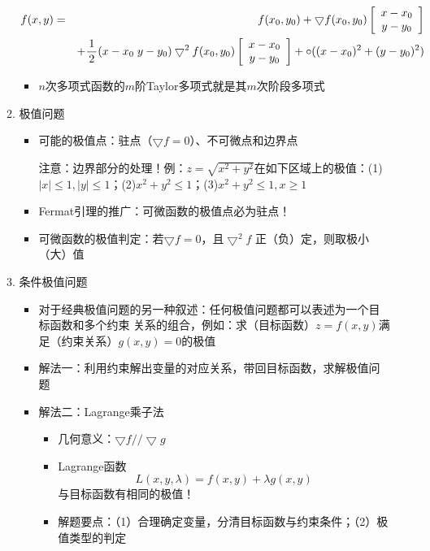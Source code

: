 \begin{enumerate}
\begin{enumerate}[(1)]
      \begin{eqnarray*}
      f(x,y)&=&f(x_0,y_0)+\bigtriangledown
      f(x_0,y_0)\left[\begin{array}{c}
      x-x_0\\ y-y_0
      \end{array}\right]\\
      &&+\displaystyle\frac{\,{1}\,}{\,{2}\,}(x-x_0\;y-y_0)\bigtriangledown^2f(x_0,y_0)
      \left[\begin{array}{c}
      x-x_0\\ y-y_0
      \end{array}\right]+\circ((x-x_0)^2+(y-y_0)^2)
	\end{eqnarray*}
	\begin{itemize}
	  \item $n$次多项式函数的$m$阶Taylor多项式就是其$m$次阶段多项式
	\end{itemize}
    \item 极值问题
    \begin{itemize}
      \item 可能的极值点：驻点（$\bigtriangledown f=0$）、不可微点和边界点
      
      注意：边界部分的处理！例：$z=\sqrt{x^2+y^2}$在如下区域上的极值：(1)
      $|x|\leq1,|y|\leq1$；(2)$x^2+y^2\leq 1$；(3)$x^2+y^2\leq 1,x\geq 1$
      \item Fermat引理的推广：可微函数的极值点必为驻点！
      \item 可微函数的极值判定：若$\bigtriangledown f=0$，且$\bigtriangledown^2f$
      正（负）定，则取极小（大）值
    \end{itemize}
    \item 条件极值问题
    \begin{itemize}
      \item 对于经典极值问题的另一种叙述：任何极值问题都可以表述为一个目标函数和多个约束
      关系的组合，例如：求（目标函数）$z=f(x,y)$满足（约束关系）$g(x,y)=0$的极值
      \item 解法一：利用约束解出变量的对应关系，带回目标函数，求解极值问题
      \item 解法二：Lagrange乘子法
      \begin{itemize}
        \item 几何意义：$\bigtriangledown f//\bigtriangledown g$
        \item Lagrange函数
        $$L(x,y,\lambda)=f(x,y)+\lambda g(x,y)$$
        与目标函数有相同的极值！
        \item 解题要点：（1）合理确定变量，分清目标函数与约束条件；（2）极值类型的判定
      \end{itemize}
    \end{itemize}
  \end{enumerate}
\end{enumerate}

